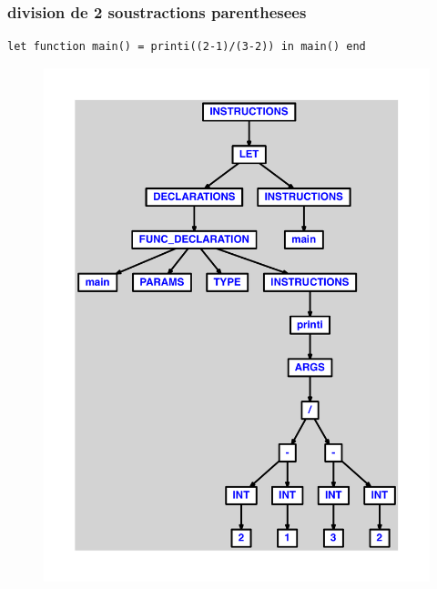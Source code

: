 \documentclass{article}
\begin{document}
\subsubsection{division de 2 soustractions parenthesees}
\begin{lstlisting}
let function main() = printi((2-1)/(3-2)) in main() end
\end{lstlisting}
\newpage
\begin{figure}[H]
\centering
\includegraphics[max width=\textwidth]{ast/ast_105.pdf}
\end{figure}
\newpage
\end{document}
